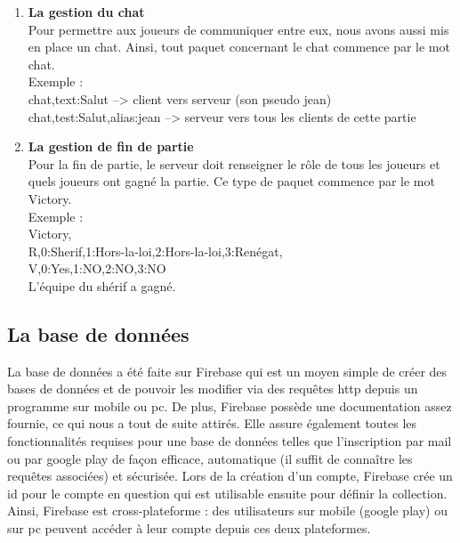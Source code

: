 \documentclass[a4paper,11pt]{article}
\begin{document}
\begin{enumerate}
	

	
	\item  \textbf{La gestion du chat} \\
	Pour permettre aux joueurs de communiquer entre eux, nous avons aussi mis en place un chat. Ainsi, tout paquet concernant le chat commence par le mot chat. \\


Exemple : \\

chat,text:Salut    --> client vers serveur (son pseudo jean) \\
chat,test:Salut,alias:jean --> serveur vers tous les clients de cette partie \\

	
 
	
	\item  \textbf{La gestion de fin de partie} \\
	Pour la fin de partie, le serveur doit renseigner le rôle de tous les joueurs et quels joueurs ont gagné la partie. Ce type de paquet commence par le mot Victory. \\

Exemple : \\

Victory, \\
R,0:Sherif,1:Hors-la-loi,2:Hors-la-loi,3:Renégat, \\
V,0:Yes,1:NO,2:NO,3:NO \\

L’équipe du shérif a gagné. \\

	
\end{enumerate}


\subsection{La base de données} 


	La base de données a été faite sur Firebase qui est un moyen simple de créer des bases de données et de pouvoir les modifier via des requêtes http depuis un programme sur mobile ou pc. De plus, Firebase possède une documentation assez fournie, ce qui nous a tout de suite attirés. 
    Elle  assure également toutes les fonctionnalités requises pour une base de données telles que l’inscription par mail ou par google play de façon efficace, automatique (il suffit de connaître les requêtes associées) et sécurisée. Lors de la création d’un compte, Firebase crée un id pour le compte en question qui est utilisable ensuite pour définir la collection. 
    Ainsi, Firebase est cross-plateforme : des utilisateurs sur mobile (google play) ou sur pc peuvent accéder à leur compte depuis ces deux plateformes. \\
\end{document}
